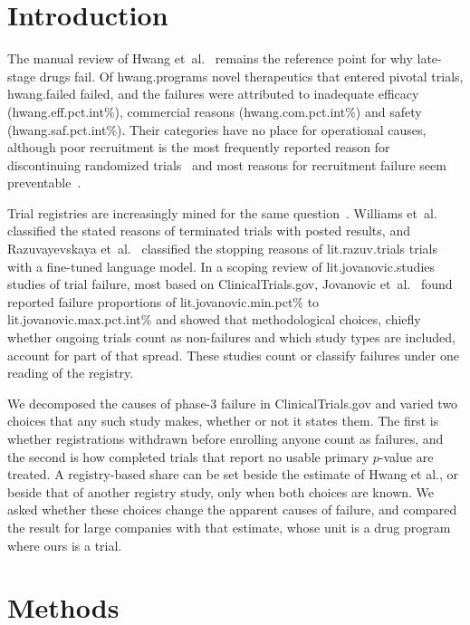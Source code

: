 \documentclass[preprint,11pt]{elsarticle}
\begin{document}
\newpage
\section{Introduction}\label{sec:intro}
The manual review of Hwang et~al.~\cite{hwang2016} remains the reference point for why late-stage drugs fail. Of \num{hwang.programs} novel therapeutics that entered pivotal trials, \num{hwang.failed} failed, and the failures were attributed to inadequate efficacy (\num{hwang.eff.pct.int}\%), commercial reasons (\num{hwang.com.pct.int}\%) and safety (\num{hwang.saf.pct.int}\%). Their categories have no place for operational causes, although poor recruitment is the most frequently reported reason for discontinuing randomized trials~\cite{kasenda2014} and most reasons for recruitment failure seem preventable~\cite{briel2016}.

Trial registries are increasingly mined for the same question~\cite{teodoro2025}. Williams et~al.~\cite{williams2015} classified the stated reasons of terminated trials with posted results, and Razuvayevskaya et~al.~\cite{razuv2024} classified the stopping reasons of \num{lit.razuv.trials} trials with a fine-tuned language model. In a scoping review of \num{lit.jovanovic.studies} studies of trial failure, most based on ClinicalTrials.gov, Jovanovic et~al.~\cite{jovanovic2026} found reported failure proportions of \num{lit.jovanovic.min.pct}\% to \num{lit.jovanovic.max.pct.int}\% and showed that methodological choices, chiefly whether ongoing trials count as non-failures and which study types are included, account for part of that spread. These studies count or classify failures under one reading of the registry.

We decomposed the causes of phase-3 failure in ClinicalTrials.gov and varied two choices that any such study makes, whether or not it states them. The first is whether registrations withdrawn before enrolling anyone count as failures, and the second is how completed trials that report no usable primary $p$-value are treated. A registry-based share can be set beside the estimate of Hwang et al., or beside that of another registry study, only when both choices are known. We asked whether these choices change the apparent causes of failure, and compared the result for large companies with that estimate, whose unit is a drug program where ours is a trial.

\section{Methods}
\end{document}
